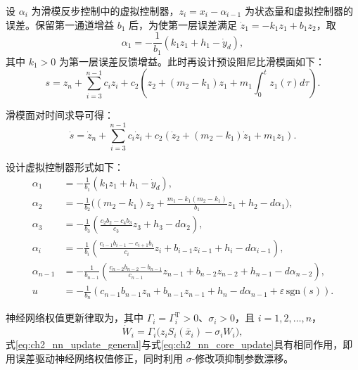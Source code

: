 设 $\alpha_i$ 为滑模反步控制中的虚拟控制器，$z_i=x_i-\alpha_{i-1}$ 为状态量和虚拟控制器的误差。保留第一通道增益 $b_1$ 后，为使第一层误差满足 $\dot z_1=-k_1z_1+b_1z_2$，取
\begin{equation}
	\alpha_1=-\frac{1}{b_1}(k_1z_1+h_1-\dot y_d),
\end{equation}
其中 $k_1>0$ 为第一层误差反馈增益。此时再设计预设阻尼比滑模面如下：
\begin{equation}\label{eq:ch3_sm_mid2}
  s=z_n+\sum_{i=3}^{n-1}c_iz_i+c_2\left(z_2+(m_2-k_1)z_1+m_1\int_0^t z_1(\tau)d\tau\right).
\end{equation}

滑模面对时间求导可得：
\begin{equation}\label{eq:ch3_sm_dot_mid}
  \dot s=\dot z_n+\sum_{i=3}^{n-1}c_i\dot z_i+c_2\left(\dot z_2+(m_2-k_1)\dot z_1+m_1z_1\right).
\end{equation}

设计虚拟控制器形式如下：
\begin{subequations}\label{eq:ch3_alpha_mid}
\begin{align}
\alpha_1&=-\frac{1}{b_1}(k_1z_1+h_1-\dot y_d),\label{eq:ch3_alpha_mid_a}\\
\alpha_2&=-\frac{1}{b_2}\Big((m_2-k_1)z_2+\frac{m_1-k_1(m_2-k_1)}{b_1}z_1+h_2-d\alpha_1\Big),\label{eq:ch3_alpha_mid_b}\\
\alpha_3&=-\frac{1}{b_3}\left(\frac{c_2b_2-c_4b_3}{c_3}z_3+h_3-d\alpha_2\right),\label{eq:ch3_alpha_mid_c}\\
\alpha_i&=-\frac{1}{b_i}\left(\frac{c_{i-1}b_{i-1}-c_{i+1}b_i}{c_i}z_i+b_{i-1}z_{i-1}+h_i-d\alpha_{i-1}\right),\label{eq:ch3_alpha_mid_d}\\
\alpha_{n-1}&=-\frac{1}{b_{n-1}}\left(\frac{c_{n-2}b_{n-2}-b_{n-1}}{c_{n-1}}z_{n-1}+b_{n-2}z_{n-2}+h_{n-1}-d\alpha_{n-2}\right),\label{eq:ch3_alpha_mid_e}\\
u&=-\frac{1}{b_n}\left(c_{n-1}b_{n-1}z_n+b_{n-1}z_{n-1}+h_n-d\alpha_{n-1}+\varepsilon\,\mathrm{sgn}(s)\right).\label{eq:ch3_alpha_mid_f}
\end{align}
\end{subequations}

神经网络权值更新律取为，其中 $\Gamma_i=\Gamma_i^{\mathrm T}>0$、$\sigma_i>0$，且 $i=1,2,\ldots,n$，
\begin{equation}\label{eq:ch2_nn_update_general}
  \dot W_i=\Gamma_i\big(z_iS_i(\bar x_i)-\sigma_iW_i\big),
\end{equation}
式\eqref{eq:ch2_nn_update_general}与式\eqref{eq:ch2_nn_core_update}具有相同作用，即用误差驱动神经网络权值修正，同时利用 $\sigma$-修改项抑制参数漂移。

